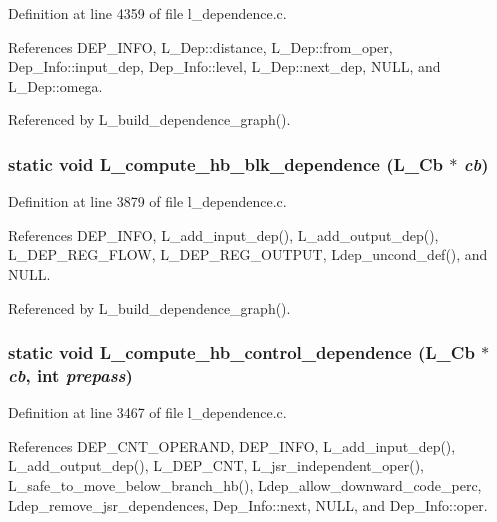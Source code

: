 Definition at line 4359 of file l\_\-dependence.c.

References DEP\_\-INFO, L\_\-Dep::distance, L\_\-Dep::from\_\-oper, Dep\_\-Info::input\_\-dep, Dep\_\-Info::level, L\_\-Dep::next\_\-dep, NULL, and L\_\-Dep::omega.

Referenced by L\_\-build\_\-dependence\_\-graph().
\subsubsection{\setlength{\rightskip}{0pt plus 5cm}static void L\_\-compute\_\-hb\_\-blk\_\-dependence (L\_\-Cb $\ast$ {\em cb})\hspace{0.3cm}{\tt  [static]}}\label{l__dependence_8c_ba1575c76d3c5b4033780287ea048cbb}




Definition at line 3879 of file l\_\-dependence.c.

References DEP\_\-INFO, L\_\-add\_\-input\_\-dep(), L\_\-add\_\-output\_\-dep(), L\_\-DEP\_\-REG\_\-FLOW, L\_\-DEP\_\-REG\_\-OUTPUT, Ldep\_\-uncond\_\-def(), and NULL.

Referenced by L\_\-build\_\-dependence\_\-graph().
\subsubsection{\setlength{\rightskip}{0pt plus 5cm}static void L\_\-compute\_\-hb\_\-control\_\-dependence (L\_\-Cb $\ast$ {\em cb}, int {\em prepass})\hspace{0.3cm}{\tt  [static]}}\label{l__dependence_8c_6f15173bce843360caa512e3086abbb1}




Definition at line 3467 of file l\_\-dependence.c.

References DEP\_\-CNT\_\-OPERAND, DEP\_\-INFO, L\_\-add\_\-input\_\-dep(), L\_\-add\_\-output\_\-dep(), L\_\-DEP\_\-CNT, L\_\-jsr\_\-independent\_\-oper(), L\_\-safe\_\-to\_\-move\_\-below\_\-branch\_\-hb(), Ldep\_\-allow\_\-downward\_\-code\_\-perc, Ldep\_\-remove\_\-jsr\_\-dependences, Dep\_\-Info::next, NULL, and Dep\_\-Info::oper.

